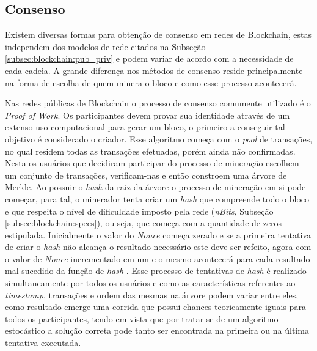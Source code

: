 \subsection{Consenso}
\label{subsec:blockchain:consenso}

Existem diversas formas para obtenção de consenso em redes de Blockchain, estas independem dos modelos de rede citados na Subseção \ref{subsec:blockchain:pub_priv} e podem variar de acordo com a necessidade de cada cadeia. A grande diferença nos métodos de consenso reside principalmente na forma de escolha de quem minera o bloco e como esse processo acontecerá.

%
Nas redes públicas de Blockchain o processo de consenso comumente utilizado é o \textit{Proof of Work}. Os participantes devem provar sua identidade através de um extenso uso computacional para gerar um bloco, o primeiro a conseguir tal objetivo é considerado o criador. Esse algoritmo começa com o \textit{pool} de transações, no qual residem todas as transações efetuadas, porém ainda não confirmadas. Nesta os usuários que decidiram participar do processo de mineração escolhem um conjunto de transações, verificam-nas e então constroem uma árvore de Merkle. Ao possuir o \textit{hash} da raiz da árvore o processo de mineração em si pode começar, para tal, o minerador tenta criar um \textit{hash} que compreende todo o bloco e que respeita o nível de dificuldade imposto pela rede (\textit{nBits}, Subseção \ref{subsec:blockchain:specs}), ou seja, que começa com a quantidade de zeros estipulada. Inicialmente o valor do \textit{Nonce} começa zerado e se a primeira tentativa de criar o \textit{hash} não alcança o resultado necessário este deve ser refeito, agora com o valor de \textit{Nonce} incrementado em um e o mesmo acontecerá para cada resultado mal sucedido da função de \textit{hash} \cite{blockchain:capitulo5, blockchain:survey_bitcoin}.
%
Esse processo de tentativas de \textit{hash} é realizado simultaneamente por todos os usuários e como as características referentes ao \textit{timestamp}, transações e ordem das mesmas na árvore podem variar entre eles, como resultado emerge uma corrida que possui chances teoricamente iguais para todos os participantes, tendo em vista que por tratar-se de um algoritmo estocástico a solução correta pode tanto ser encontrada na primeira ou na última tentativa executada.

